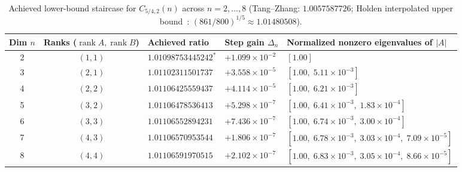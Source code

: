 \documentclass[10pt,letterpaper]{article}
\newcommand{\rank}{\operatorname{rank}}
\begin{document}
\begin{table}[H]
\centering
\caption{\small Achieved lower-bound staircase for $C_{5/4,2}(n)$ across $n = 2,\dots,8$ (Tang--Zhang: $1.0057587726$; Holden interpolated upper bound~\cite{Holden2026b}: $(861/800)^{1/5} \approx 1.01480508$).}
\vspace{3pt}
\footnotesize
\begin{tabular}{@{}c c l l l@{}}
\toprule
\textbf{Dim $n$} & \textbf{Ranks ($\rank A, \rank B$)} & \textbf{Achieved ratio} & \textbf{Step gain $\Delta_n$} & \textbf{Normalized nonzero eigenvalues of $|A|$} \\
\midrule
2 & $(1,1)$ & $1.01098753445242^*$ & $+1.099\times 10^{-2}$ & $[1.00]$ \\
3 & $(2,1)$ & $1.01102311501737$   & $+3.558\times 10^{-5}$ & $[1.00,\; 5.11\times 10^{-3}]$ \\
4 & $(2,2)$ & $1.01106425559437$   & $+4.114\times 10^{-5}$ & $[1.00,\; 6.21\times 10^{-3}]$ \\
5 & $(3,2)$ & $1.01106478536413$   & $+5.298\times 10^{-7}$ & $[1.00,\; 6.41\times 10^{-3},\; 1.83\times 10^{-4}]$ \\
6 & $(3,3)$ & $1.01106552894231$   & $+7.436\times 10^{-7}$ & $[1.00,\; 6.74\times 10^{-3},\; 3.00\times 10^{-4}]$ \\
7 & $(4,3)$ & $1.01106570953544$   & $+1.806\times 10^{-7}$ & $[1.00,\; 6.78\times 10^{-3},\; 3.03\times 10^{-4},\; 7.09\times 10^{-5}]$ \\
8 & $(4,4)$ & $1.01106591970515$   & $+2.102\times 10^{-7}$ & $[1.00,\; 6.83\times 10^{-3},\; 3.05\times 10^{-4},\; 8.66\times 10^{-5}]$ \\
\bottomrule
\end{tabular}
\label{tab:p54}
\end{table}
\end{document}
